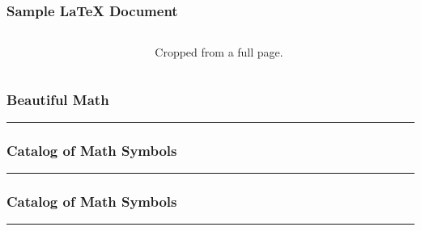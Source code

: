 \documentclass{beamer}
\newcommand{\samplerow}[2]{
	\begin{frame}
	\frametitle{#2}
	
	\hrule
	\vspace*{4pt}
	\begin{minipage}{\linewidth}
		
	\end{minipage}
	\end{frame}
}
\let\oldLaTeX\LaTeX
\renewcommand{\LaTeX}{\oldLaTeX\xspace}
\begin{document}
	\begin{frame}
		\frametitle{Sample \LaTeX Document}
		\begin{columns}[T]
			\begin{column}{0.5\textwidth}
			
			\end{column}
			\begin{column}{0.5\textwidth}
			\begin{center}
			\end{center}
			Cropped from a full page.
			\end{column}
		\end{columns}
	\end{frame}

	\samplerow{Math.tex}{Beautiful Math}
	\samplerow{Math-Symb.tex}{Catalog of Math Symbols}
	\samplerow{Math-Symb2.tex}{Catalog of Math Symbols}
\end{document}
